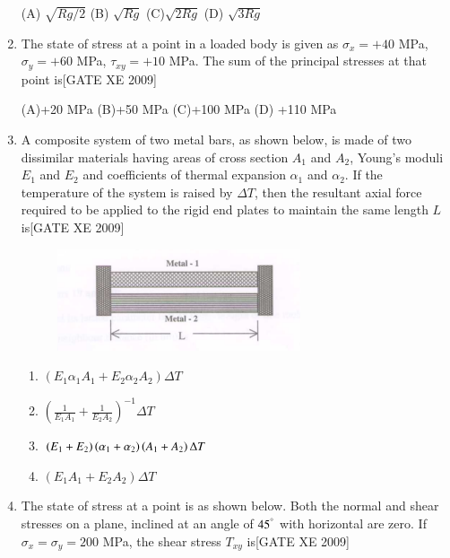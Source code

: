 \documentclass[journal,12pt,onecolumn]{IEEEtran}
\theoremstyle{remark}
\begin{document}
\begin{enumerate}
   (A)  $\sqrt{Rg/2}$  \hfill
   (B)  $\sqrt{Rg}$  \hfill
    (C)$\sqrt{2Rg}$  \hfill 
    (D) $\sqrt{3Rg}$ \hfill




\noindent
\item The state of stress at a point in a loaded body is given as $\sigma_x = +40$ MPa, $\sigma_y = +60$ MPa, $\tau_{xy} = +10$ MPa. The sum of the principal stresses at that point is\hfill[GATE XE 2009]

     (A)+20 MPa \hfill
     (B)+50 MPa  \hfill
     (C)+100 MPa \hfill
    (D) +110 MPa




\noindent
\item A composite system of two metal bars, as shown below, is made of two dissimilar materials having areas of cross section $A_1$ and $A_2$, Young's moduli $E_1$ and $E_2$ and coefficients of thermal expansion $\alpha_1$ and $\alpha_2$. If the temperature of the system is raised by $\Delta T$, then the resultant axial force required to be applied to the rigid end plates to maintain the same length $L$ is\hfill[GATE XE 2009]
\begin{figure}[H]
    \centering
    \includegraphics[width=0.5\linewidth]{figs/fig8.png}
    \caption*{}
    \label{fig:Q 65}
\end{figure}
\begin{enumerate}

    \item $(E_1 \alpha_1 A_1 + E_2 \alpha_2 A_2) \Delta T$
    \item $\left(\frac{1}{E_1 A_1} + \frac{1}{E_2 A_2} \right)^{-1} \Delta T$
    \item $(E_1 + E_2)\left(\alpha_1 + \alpha_2\right)\left(A_1 + A_2\right) \Delta T$
    \item $(E_1 A_1 + E_2 A_2) \Delta T$
 
\end{enumerate}

\item The state of stress at a point is as shown below. Both the normal and shear stresses on a plane, inclined at an angle of $45^\degree$ with horizontal are zero. If $\sigma_x = \sigma_y = 200$ MPa, the shear stress $T_{xy}$ is\hfill[GATE XE 2009]


\end{enumerate}
\end{document}
